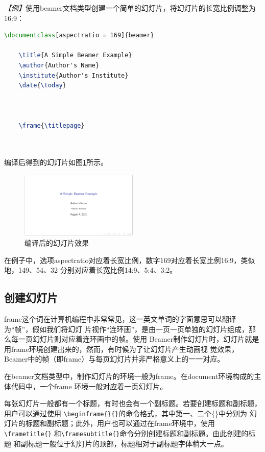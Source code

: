\emph{【例】}使用beamer文档类型创建一个简单的幻灯片，将幻灯片的长宽比例调整为16:9：
\begin{lstlisting}[language=TeX]
    \documentclass[aspectratio = 169]{beamer}

    \title{A Simple Beamer Example}
    \author{Author's Name}
    \institute{Author's Institute}
    \date{\today} 

    

    \frame{\titlepage}

    
\end{lstlisting}

编译后得到的幻灯片如图\ref{fig:902}所示。

\begin{figure}[htbp]
    \centering
    \includegraphics[width = 0.5\textwidth]{images/ch_9/example2.png}
    \caption{编译后的幻灯片效果}
    \label{fig:902}
\end{figure}


在例子中，选项aspectratio对应着长宽比例，数字169对应着长宽比例16:9，类似地，149、54、32
分别对应着长宽比例14:9、5:4、3:2。

\subsection{创建幻灯片}

frame这个词在计算机编程中非常常见，这一英文单词的字面意思可以翻译为“帧”，假如我们将幻灯
片视作“连环画”，是由一页一页单独的幻灯片组成，那么每一页幻灯片则对应着连环画中的帧。使用
Beamer制作幻灯片时，幻灯片就是用frame环境创建出来的，然而，有时候为了让幻灯片产生动画视
觉效果，Beamer中的帧（即frame）与每页幻灯片并非严格意义上的一一对应。

在beamer文档类型中，制作幻灯片的环境一般为frame。在document环境构成的主体代码中，一个frame
环境一般对应着一页幻灯片。

每张幻灯片一般都有一个标题，有时也会有一个副标题。若要创建标题和副标题，用户可以通过使用
\texttt{\textbackslash{}begin{frame}\{\}\{\}}的命令格式，其中第一、二个\{\}中分别为
幻灯片的标题和副标题；此外，用户也可以通过在frame环境中，使用\texttt{\textbackslash{}frametitle\{\}}
和\texttt{\textbackslash{}framesubtitle\{\}}命令分别创建标题和副标题。由此创建的标题
和副标题一般位于幻灯片的顶部，标题相对于副标题字体稍大一点。


